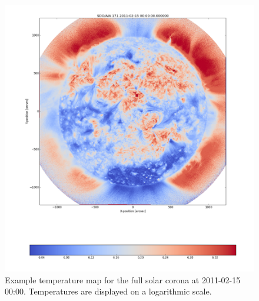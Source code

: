 \documentclass[referee,a4paper,12pt]{swsc}
\begin{document}
\begin{linenumbers}
\begin{figure}
	\centering
		\includegraphics[width=\columnwidth]{2011-02-15T00_00_00.png}
	\caption{Example temperature map for the full solar corona at 2011-02-15 00:00. Temperatures are displayed on a logarithmic scale.}
	\label{fig:example_tmap}
\end{figure}


\end{linenumbers}
\end{document}

